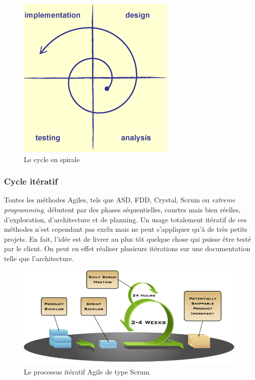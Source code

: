 \begin{figure}[h]
\begin{center}
    \includegraphics[scale=0.5]{img/spiral-model}
    \caption{Le cycle en spirale}
	\label{spiral-model}
\end{center}
\end{figure}

\subsubsection{Cycle itératif}

Toutes les méthodes Agiles, tels que ASD, FDD, Crystal, Scrum ou \textit{extreme programming},  débutent par des phases séquentielles, courtes mais bien réelles, d'exploration, d'architecture et de planning. Un usage totalement itératif de ces méthodes n'est cependant pas exclu mais ne peut s'appliquer qu'à de très petits projets. En fait, l'idée est de livrer au plus tôt quelque chose qui puisse être testé par le client. On peut en effet réaliser plusieurs itérations sur une documentation telle que l'architecture. 

\begin{figure}[h]
\begin{center}
    \includegraphics[scale=0.5]{img/scrum}
    \caption{Le processus itératif Agile de type Scrum}
	\label{scrum}
\end{center}
\end{figure}

